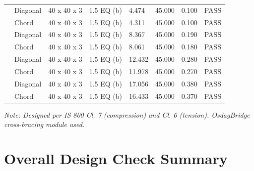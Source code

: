 \documentclass[12pt,a4paper]{report}
\numberwithin{table}{chapter}
\numberwithin{figure}{chapter}
\newcommand{\ReportTableRowGap}{6pt}
\begin{document}
\begin{longtable}{|C{2.0cm}|L{1.8cm}|C{2.2cm}|C{3.0cm}|C{1.8cm}|C{1.8cm}|C{1.2cm}|C{1.8cm}|}
\hline
{} & Diagonal & 40 x 40 x 3 & 1.5 EQ (b) & 4.474 & 45.000 & 0.100 & \textcolor{reportBlack}{PASS} \\[\ReportTableRowGap]
 & Chord & 40 x 40 x 3 & 1.5 EQ (b) & 4.311 & 45.000 & 0.100 & \textcolor{reportBlack}{PASS} \\[\ReportTableRowGap]
\hline
{} & Diagonal & 40 x 40 x 3 & 1.5 EQ (b) & 8.367 & 45.000 & 0.190 & \textcolor{reportBlack}{PASS} \\[\ReportTableRowGap]
 & Chord & 40 x 40 x 3 & 1.5 EQ (b) & 8.061 & 45.000 & 0.180 & \textcolor{reportBlack}{PASS} \\[\ReportTableRowGap]
\hline
{} & Diagonal & 40 x 40 x 3 & 1.5 EQ (b) & 12.432 & 45.000 & 0.280 & \textcolor{reportBlack}{PASS} \\[\ReportTableRowGap]
 & Chord & 40 x 40 x 3 & 1.5 EQ (b) & 11.978 & 45.000 & 0.270 & \textcolor{reportBlack}{PASS} \\[\ReportTableRowGap]
\hline
{} & Diagonal & 40 x 40 x 3 & 1.5 EQ (b) & 17.056 & 45.000 & 0.380 & \textcolor{reportBlack}{PASS} \\[\ReportTableRowGap]
 & Chord & 40 x 40 x 3 & 1.5 EQ (b) & 16.433 & 45.000 & 0.370 & \textcolor{reportBlack}{PASS} \\[\ReportTableRowGap]
\hline
\end{longtable}
\noindent\textit{Note: Designed per IS 800 Cl. 7 (compression) and Cl. 6 (tension). OsdagBridge cross-bracing module used.}

\section{Overall Design Check Summary}
\label{sec:overall-summary}
\end{document}
